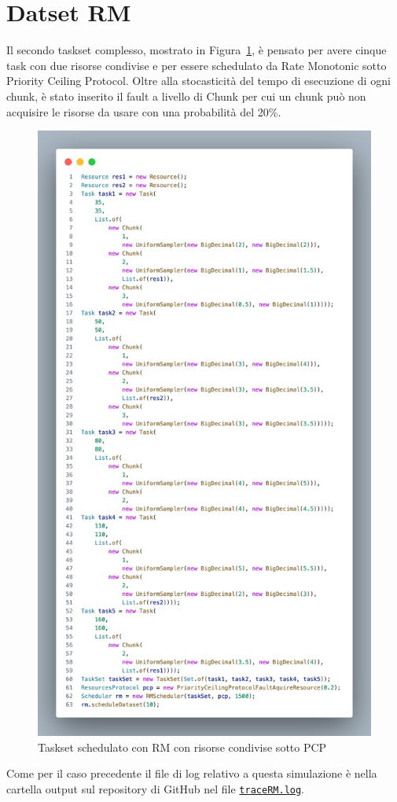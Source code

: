 \section{Datset RM}
Il secondo taskset complesso, mostrato in Figura~\ref{fig:datasetRM}, è pensato per avere cinque task con due risorse condivise e per essere schedulato da Rate Monotonic sotto Priority Ceiling Protocol. Oltre alla stocasticità del tempo di esecuzione di ogni chunk, è stato inserito il fault a livello di Chunk per cui un chunk può non acquisire le risorse da usare con una probabilità del 20\%.

\begin{figure}[htbp]
\includegraphics[width=.5\textwidth]{immagini/datasetRM.pdf}
\centering
\caption{Taskset schedulato con RM con risorse condivise sotto PCP}
\label{fig:datasetRM}

\end{figure}
Come per il caso precedente il file di log relativo a questa simulazione è nella cartella output sul repository di GitHub nel file \href{https://github.com/edoardosarri24/real-time-scheduling-simulator/blob/master/output/traceRM.log}{\texttt{traceRM.log}}.